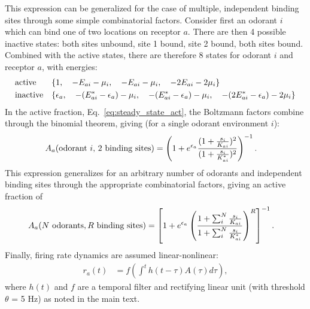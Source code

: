 \documentclass[9pt,twoside,lineno]{pnas-new}
\begin{document}
This expression can be generalized for the case of multiple, independent binding sites through some simple combinatorial factors. Consider first an odorant $i$ which can bind one of two locations on receptor $a$. There are then 4 possible inactive states: both sites unbound, site 1 bound, site 2 bound, both sites bound. Combined with the active states, there are therefore 8 states for odorant $i$ and receptor $a$, with energies: 
\begin{align}
& \textup{active}  && \{1, \quad -E_{ai} - \mu_i, \quad -E_{ai} - \mu_i, \quad -2E_{ai} - 2\mu_i\} \nonumber \\
& \textup{inactive}  && \{\epsilon_a, \quad -(E^*_{ai}  - \epsilon_a) - \mu_i, \quad -(E^*_{ai}  - \epsilon_a) - \mu_i, \quad -(2E^*_{ai}  - \epsilon_a) - 2\mu_i\} 
\end{align}
In the active fraction, Eq.~\ref{eq:steady_state_act}, the Boltzmann factors combine through the binomial theorem, giving (for a single odorant environment $i$):
\begin{align}
A_a(\textup {odorant }i \textup{, 2 binding sites}) &= 
    \left(1 + e^{\epsilon_a}\frac{(1 + \frac{s_i}{K_{ai}})^2}{(1 + \frac{s_i}{K^*_{ai}})^2}
    \right)^{-1}.
\end{align} 
This expression generalizes for an arbitrary number of odorants and independent binding sites through the appropriate combinatorial factors, giving an active fraction of
\begin{align}
A_a(N \textup { odorants}, R \textup { binding sites}) &= 
    \left[1 + e^{\epsilon_a}\left(\frac{1 + \sum_i^N\frac{s_i}{K_{ai}}}{1 + \sum_i^N \frac{s_i}{K^*_{ai}}}\right)^R\right]^{-1}. 
\end{align} 
Finally, firing rate dynamics are assumed linear-nonlinear:
\begin{align}
r_a(t) &= f\left(\int^t h(t - \tau) A(\tau) d\tau\right) \label{eq:firing_machinery},
\end{align}
where $h(t)$ and $f$ are a temporal filter and rectifying linear unit (with threshold $\theta$ = 5 Hz) as noted in the main text.








\iffalse
\end{document}
